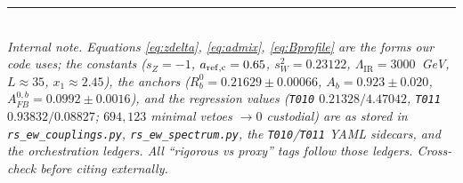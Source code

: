 \documentclass[11pt]{article}
\newcommand{\LIR}{\Lambda_{\mathrm{IR}}}
\newcommand{\swsq}{s_W^2}
\newcommand{\code}[1]{\texttt{#1}}
\newcommand{\Afb}{A_{FB}^{0,b}}
\theoremstyle{definition}
\begin{document}
\bigskip
\noindent\rule{\linewidth}{0.4pt}\\
\footnotesize
\emph{Internal note. Equations \eqref{eq:zdelta}, \eqref{eq:admix},
\eqref{eq:Bprofile} are the forms our code uses; the constants
($s_Z=-1$, $a_{\rm ref,c}=0.65$, $\swsq=0.23122$, $\LIR=3000$~GeV, $L\approx35$,
$x_1\approx2.45$), the anchors ($R_b^0=0.21629\pm0.00066$, $A_b=0.923\pm0.020$,
$\Afb=0.0992\pm0.0016$), and the regression values (\code{T010} $0.21328/4.47042$,
\code{T011} $0.93832/0.08827$; $694{,}123$ minimal vetoes $\to 0$ custodial) are
as stored in \code{rs\_ew\_couplings.py}, \code{rs\_ew\_spectrum.py}, the
\code{T010}/\code{T011} YAML sidecars, and the orchestration ledgers. All
``rigorous vs proxy'' tags follow those ledgers. Cross-check before citing
externally.}
\end{document}
